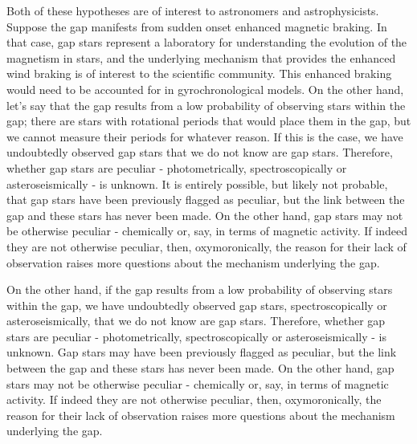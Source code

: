Both of these hypotheses are of interest to astronomers and astrophysicists.
Suppose the gap manifests from sudden onset enhanced magnetic braking. 
In that case, gap stars represent a laboratory for understanding the evolution of the magnetism in stars, and the underlying mechanism that provides the enhanced wind braking is of interest to the scientific community. 
This enhanced braking would need to be accounted for in gyrochronological models.
On the other hand, let's say that the gap results from a low probability of observing stars within the gap; there are stars with rotational periods that would place them in the gap, but we cannot measure their periods for whatever reason.
If this is the case, we have undoubtedly observed gap stars that we do not know are gap stars.
Therefore, whether gap stars are peculiar - photometrically, spectroscopically or asteroseismically - is unknown.
It is entirely possible, but likely not probable, that gap stars have been previously flagged as peculiar, but the link between the gap and these stars has never been made.
On the other hand, gap stars may not be otherwise peculiar - chemically or, say, in terms of magnetic activity.
If indeed they are not otherwise peculiar, then, oxymoronically, the reason for their lack of observation raises more questions about the mechanism underlying the gap.

On the other hand, if the gap results from a low probability of observing stars within the gap, we have undoubtedly observed gap stars, spectroscopically or asteroseismically, that we do not know are gap stars.
Therefore, whether gap stars are peculiar - photometrically, spectroscopically or asteroseismically - is unknown.
Gap stars may have been previously flagged as peculiar, but the link between the gap and these stars has never been made.
On the other hand, gap stars may not be otherwise peculiar - chemically or, say, in terms of magnetic activity.
If indeed they are not otherwise peculiar, then, oxymoronically, the reason for their lack of observation raises more questions about the mechanism underlying the gap.

